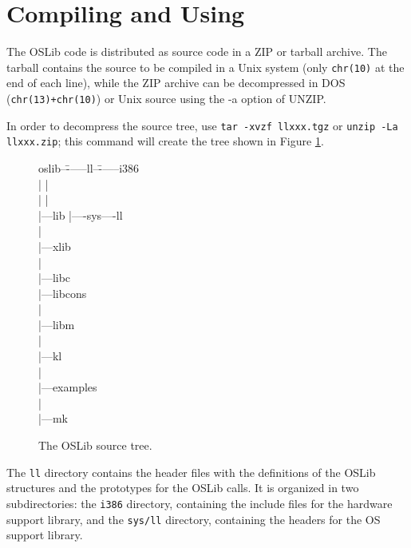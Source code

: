 \documentclass[a4paper]{report}
\begin{document}
\section{Compiling and Using}
The OSLib code is distributed as source code in a ZIP or tarball
archive. The tarball contains the source to be compiled in a Unix
system (only  {\tt chr(10)} at the end of each line), while the ZIP
archive can be decompressed in DOS ({\tt chr(13)+chr(10)}) or Unix
source using the -a option of UNZIP.

In order to decompress the source tree, use {\tt tar -xvzf llxxx.tgz}
or {\tt unzip -La llxxx.zip}; this command will create the tree shown in
Figure \ref{fig:tree}.

\begin{figure}
\begin{tt}
\begin{tabbing}
oslib--\=------ll--\=------i386		\\
\>	| \>		|			\\
\>	| \>		|			\\
\>	|---lib	\>	|----sys----ll		\\
\>	|					\\
\>	|---xlib \>				\\
\>	| \>					\\
\>	|---libc \>				\\
\>	|---libcons \>				\\
\>	| \>					\\
\>	|---libm \>				\\
\>	|					\\
\>	|---kl					\\
\>	|					\\
\>	|---examples				\\
\>	|					\\
\>	|---mk					\\
\end{tabbing}
\end{tt}
\caption{The OSLib source tree.}
\label{fig:tree}
\end{figure}

The {\tt ll} directory contains the header files with the
definitions of the OSLib structures and the prototypes for the OSLib calls.
It is organized in two subdirectories: the {\tt i386} directory,
containing the include files for the hardware support library, and
the {\tt sys/ll} directory, containing the headers for the OS support
library.
\end{document}
